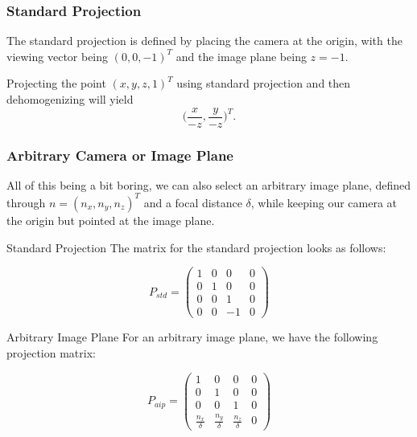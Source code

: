 \documentclass[english]{panikzettel}
\begin{document}
\begin{halfboxl}
\subsubsection*{Standard Projection}


The standard projection is defined by placing the camera at the origin, with the viewing vector being $(0, 0, -1)^T$ and the image plane being $z = -1$.

Projecting the point $(x, y, z, 1)^T$ using standard projection and then dehomogenizing will yield $$\big( \frac{x}{-z}, \frac{y}{-z}\big)^T.$$

\subsubsection*{Arbitrary Camera or Image Plane}

All of this being a bit boring, we can also select an arbitrary image plane, defined through $n =(n_x, n_y, n_z)^T$ and a focal distance $\delta$, while keeping our camera at the origin but pointed at the image plane.

\end{halfboxl}%
\begin{halfboxr}
\vspace{-\baselineskip}
\begin{defi}{Standard Projection}
The matrix for the standard projection looks as follows:

$$P_{std} =
\begin{pmatrix}
1 & 0 & 0 & 0 \\
0 & 1 & 0 & 0 \\
0 & 0 & 1 & 0 \\
0 & 0 & -1 & 0
\end{pmatrix}$$
\end{defi}

\begin{defi}{Arbitrary Image Plane}
For an arbitrary image plane, we have the following projection matrix:

$$P_{aip} =
\begin{pmatrix}
1 & 0 & 0 & 0 \\
0 & 1 & 0 & 0 \\
0 & 0 & 1 & 0 \\
\frac{n_x}{\delta} & \frac{n_y}{\delta} & \frac{n_z}{\delta} & 0
\end{pmatrix}$$
\end{defi}
\end{halfboxr}
\end{document}
